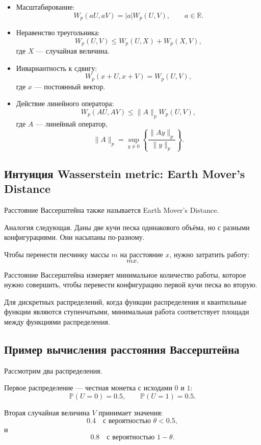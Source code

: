 \documentclass[12pt,a4paper]{article}
\begin{document}
\begin{itemize}
    \item Масштабирование:
    \[
    W_p(aU,aV)
    =
    |a|W_p(U,V),
    \qquad
    a \in \mathbb R.
    \]

    \item Неравенство треугольника:
    \[
    W_p(U,V)
    \le
    W_p(U,X)
    +
    W_p(X,V),
    \]
    где $X$ --- случайная величина.

    \item Инвариантность к сдвигу:
    \[
    W_p(x+U,x+V)
    =
    W_p(U,V),
    \]
    где $x$ --- постоянный вектор.

    \item Действие линейного оператора:
    \[
    W_p(AU,AV)
    \le
    \|A\|_p W_p(U,V),
    \]
    где $A$ --- линейный оператор,
    \[
    \|A\|_p
    =
    \sup_{y\ne 0}
    \left\{
    \frac{\|Ay\|_p}{\|y\|_p}
    \right\}.
    \]
\end{itemize}

\subsection{Интуиция Wasserstein metric: Earth Mover's Distance}

Расстояние Вассерштейна также называется Earth Mover's Distance.

Аналогия следующая. Даны две кучи песка одинакового объёма, но с разными конфигурациями. Они насыпаны по-разному.

Чтобы перенести песчинку массы $m$ на расстояние $x$, нужно затратить работу:
\[
mx.
\]

Расстояние Вассерштейна измеряет минимальное количество работы, которое нужно совершить, чтобы перевести конфигурацию первой кучи песка во вторую.

Для дискретных распределений, когда функции распределения и квантильные функции являются ступенчатыми, минимальная работа соответствует площади между функциями распределения.

\subsection{Пример вычисления расстояния Вассерштейна}

Рассмотрим два распределения.

Первое распределение --- честная монетка с исходами $0$ и $1$:
\[
\mathbb P(U=0)=0.5,
\qquad
\mathbb P(U=1)=0.5.
\]

Вторая случайная величина $V$ принимает значения:
\[
0.4
\quad
\text{с вероятностью }
\theta < 0.5,
\]
и
\[
0.8
\quad
\text{с вероятностью }
1-\theta.
\]
\end{document}
